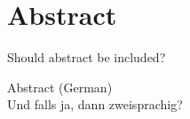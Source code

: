 %
\chapter*{Abstract}
\label{sec:abstract}
\vspace*{-10mm}

Should abstract be included?






\vspace*{20mm}

{Abstract (German)}\label{sec:abstract-german} \\

Und falls ja, dann zweisprachig?
